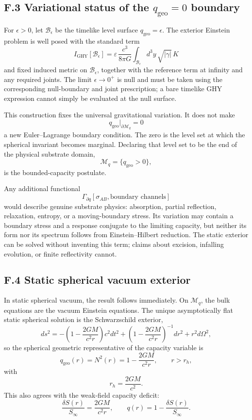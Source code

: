 \documentclass[11pt]{article}
\begin{document}
\subsection*{F.3 Variational status of the $q_{\mathrm{geo}}=0$ boundary}

For $\epsilon>0$, let $\mathcal B_\epsilon$ be the timelike level surface $q_{\mathrm{geo}}=\epsilon$. The exterior Einstein problem is well posed with the standard term
\[
I_{\mathrm{GHY}}[\mathcal B_\epsilon]
=\varepsilon\,\frac{c^3}{8\pi G}
\int_{\mathcal B_\epsilon}d^3y\,\sqrt{|\gamma|}\,K
\]
and fixed induced metric on $\mathcal B_\epsilon$, together with the reference term at infinity and any required joints. The limit $\epsilon\to0^+$ is null and must be taken using the corresponding null-boundary and joint prescription; a bare timelike GHY expression cannot simply be evaluated at the null surface.

This construction fixes the universal gravitational variation. It does not make
\[
q_{\mathrm{geo}}\big|_{\partial\mathcal M_q}=0
\]
a new Euler--Lagrange boundary condition. The zero is the level set at which the spherical invariant becomes marginal. Declaring that level set to be the end of the physical substrate domain,
\[
\mathcal M_q=\{q_{\mathrm{geo}}>0\},
\]
is the bounded-capacity postulate.

Any additional functional
\[
\Gamma_{\partial q}[\sigma_{AB},\text{boundary channels}]
\]
would describe genuine substrate physics: absorption, partial reflection, relaxation, entropy, or a moving-boundary stress. Its variation may contain a boundary stress and a response conjugate to the limiting capacity, but neither its form nor its spectrum follows from Einstein--Hilbert reduction. The static exterior can be solved without inventing this term; claims about excision, infalling evolution, or finite reflectivity cannot.

\subsection*{F.4 Static spherical vacuum exterior}

In static spherical vacuum, the result follows immediately. On $\mathcal{M}_q$, the bulk equations are the vacuum Einstein equations. The unique asymptotically flat static spherical solution is the Schwarzschild exterior,
\[
ds^2
=
-\left(1-\frac{2GM}{c^2r}\right)c^2dt^2
+
\left(1-\frac{2GM}{c^2r}\right)^{-1}dr^2
+
r^2d\Omega^2,
\]
so the spherical geometric representative of the capacity variable is
\[
q_{\mathrm{geo}}(r)=N^2(r)=1-\frac{2GM}{c^2r},
\qquad
r>r_h,
\]
with
\[
r_h=\frac{2GM}{c^2}.
\]
This also agrees with the weak-field capacity deficit:
\[
\frac{\delta S(r)}{S_\infty}
=
\frac{2GM}{c^2r},
\qquad
q(r)=1-\frac{\delta S(r)}{S_\infty}.
\]
\end{document}
